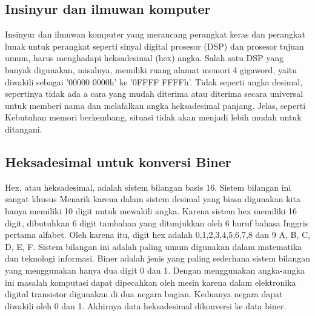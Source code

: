 \subsection{Insinyur dan ilmuwan komputer}
Insinyur dan ilmuwan komputer yang merancang perangkat keras dan perangkat lunak untuk perangkat seperti sinyal digital
prosesor (DSP) dan prosesor tujuan umum, harus menghadapi heksadesimal (hex)
angka. Salah satu DSP yang banyak digunakan, misalnya, memiliki ruang alamat memori 4 gigaword, yaitu
diwakili sebagai '00000 0000h' ke '0FFFF FFFFh'. Tidak seperti angka desimal, sepertinya tidak ada a
cara yang mudah diterima atau diterima secara universal untuk memberi nama dan melafalkan angka heksadesimal panjang. Jelas, seperti
Kebutuhan memori berkembang, situasi tidak akan menjadi lebih mudah untuk ditangani.

\subsection{Heksadesimal untuk konversi Biner}
Hex, atau heksadesimal, adalah sistem bilangan basis 16. Sistem bilangan ini sangat khusus
Menarik karena dalam sistem desimal yang biasa digunakan kita hanya memiliki 10 digit untuk mewakili angka.
Karena sistem hex memiliki 16 digit, dibutuhkan 6 digit tambahan yang ditunjukkan oleh 6 huruf bahasa Inggris pertama
alfabet. Oleh karena itu, digit hex adalah 0,1,2,3,4,5,6,7,8 dan 9 A, B, C, D, E, F. Sistem bilangan ini adalah
paling umum digunakan dalam matematika dan teknologi informasi. Biner adalah jenis yang paling sederhana
sistem bilangan yang menggunakan hanya dua digit 0 dan 1. Dengan menggunakan angka-angka ini masalah komputasi
dapat dipecahkan oleh mesin karena dalam elektronika digital transistor digunakan di dua negara bagian. Keduanya
negara dapat diwakili oleh 0 dan 1. Akhirnya data heksadesimal dikonversi ke data biner.
